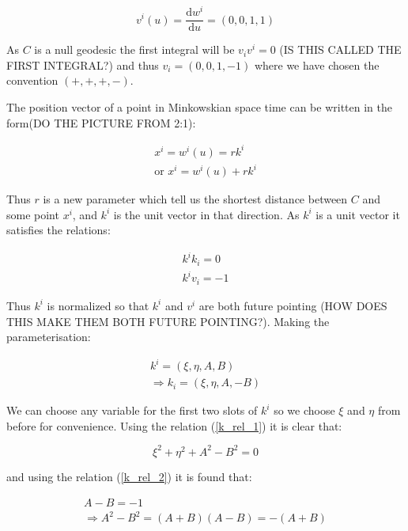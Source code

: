 \begin{equation*} 
v^i (u) = \frac{\mathrm{d} w^i}{\mathrm{d}u} = (0,0,1,1)
\end{equation*} 
   
\noindent As $C$ is a null geodesic the first integral will be $v_i v^i = 0$ (IS THIS CALLED THE FIRST INTEGRAL?) and thus $v_i = (0,0,1,-1)$ where we have chosen the convention $(+,+,+,-)$. 

The position vector of a point in Minkowskian space time can be written in the form(DO THE PICTURE FROM 2:1):

\begin{eqnarray*}
x^i = w^i (u) = r k^i \\
\text{or } x^i = w^i(u) + r k^i 
\end{eqnarray*}

\noindent Thus $r$ is a new parameter which tell us the shortest distance between $C$ and some point $x^i$, and $k^i$ is the unit vector in that direction. As $k^i$ is a unit vector it satisfies the relations:

\begin{eqnarray}
k^i k_i = 0 \label{k_rel_1}\\
k^i v_i = -1 \label{k_rel_2}
\end{eqnarray}

\noindent Thus $k^i$ is normalized so that $k^i$ and $v^i$ are both future pointing (HOW DOES THIS MAKE THEM BOTH FUTURE POINTING?). Making the parameterisation:

\begin{eqnarray*}
k^i = (\xi, \eta, A, B) \\
\Rightarrow k_i = (\xi, \eta, A, -B)
\end{eqnarray*}

\noindent We can choose any variable for the first two slots of $k^i$ so we choose $\xi$ and $\eta$ from before for convenience. Using the relation (\ref{k_rel_1}) it is clear that:

\begin{equation*}
\xi^2 + \eta^2 + A^2 - B^2 = 0
\end{equation*}

\noindent and using the relation (\ref{k_rel_2}) it is found that:

\begin{eqnarray}
A - B = -1 \label{sim_rel_1}\\
\Rightarrow A^2 - B^2 = (A + B)(A - B) = - (A + B)
\end{eqnarray}


